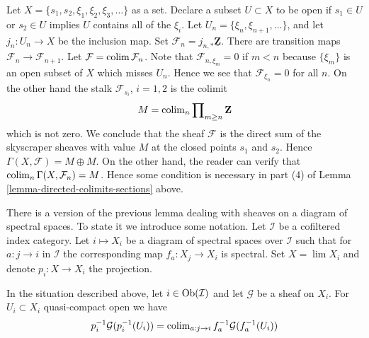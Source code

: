 \begin{example}
\label{example-conditions-needed-colimit}
Let $X = \{s_1, s_2, \xi_1, \xi_2, \xi_3, \ldots\}$ as a set.
Declare a subset $U \subset X$ to be open
if $s_1 \in U$ or $s_2 \in U$ implies $U$ contains all of the
$\xi_i$. Let $U_n = \{\xi_n, \xi_{n + 1}, \ldots\}$, and
let $j_n : U_n \to X$ be the inclusion map.
Set $\mathcal{F}_n = j_{n, *}\underline{\mathbf{Z}}$.
There are transition maps $\mathcal{F}_n \to \mathcal{F}_{n + 1}$.
Let $\mathcal{F} = \mathop{\mathrm{colim}}\nolimits \mathcal{F}_n$.
Note that $\mathcal{F}_{n, \xi_m} = 0$ if $m < n$
because $\{\xi_m\}$ is an open subset of $X$ which misses $U_n$.
Hence we see that $\mathcal{F}_{\xi_n} = 0$ for all $n$.
On the other hand the stalk $\mathcal{F}_{s_i}$, $i = 1, 2$
is the colimit
$$
M = \mathop{\mathrm{colim}}\nolimits_n \prod\nolimits_{m \geq n} \mathbf{Z}
$$
which is not zero. We conclude that the sheaf
$\mathcal{F}$ is the direct sum of the
skyscraper sheaves with value $M$ at the closed points
$s_1$ and $s_2$. Hence $\Gamma(X, \mathcal{F}) = M \oplus M$.
On the other hand, the reader can verify that
$\mathop{\mathrm{colim}}\nolimits_n \Gamma(X, \mathcal{F}_n) = M$.
Hence some condition is necessary in part (4)
of Lemma \ref{lemma-directed-colimits-sections} above.
\end{example}

\noindent
There is a version of the previous lemma dealing with sheaves on a diagram
of spectral spaces. To state it we introduce some notation.
Let $\mathcal{I}$ be a cofiltered index category.
Let $i \mapsto X_i$ be a diagram of spectral spaces over $\mathcal{I}$
such that for $a : j \to i$ in $\mathcal{I}$ the corresponding map
$f_a : X_j \to X_i$ is spectral. Set $X = \lim X_i$ and denote
$p_i : X \to X_i$ the projection.

\begin{lemma}
\label{lemma-compute-pullback-to-limit}
In the situation described above, let $i \in \mathop{\mathrm{Ob}}\nolimits(\mathcal{I})$ and let
$\mathcal{G}$ be a sheaf on $X_i$. For $U_i \subset X_i$
quasi-compact open we have
$$
p_i^{-1}\mathcal{G}(p_i^{-1}(U_i)) =
\mathop{\mathrm{colim}}\nolimits_{a : j \to i} f_a^{-1}\mathcal{G}(f_a^{-1}(U_i))
$$
\end{lemma}

